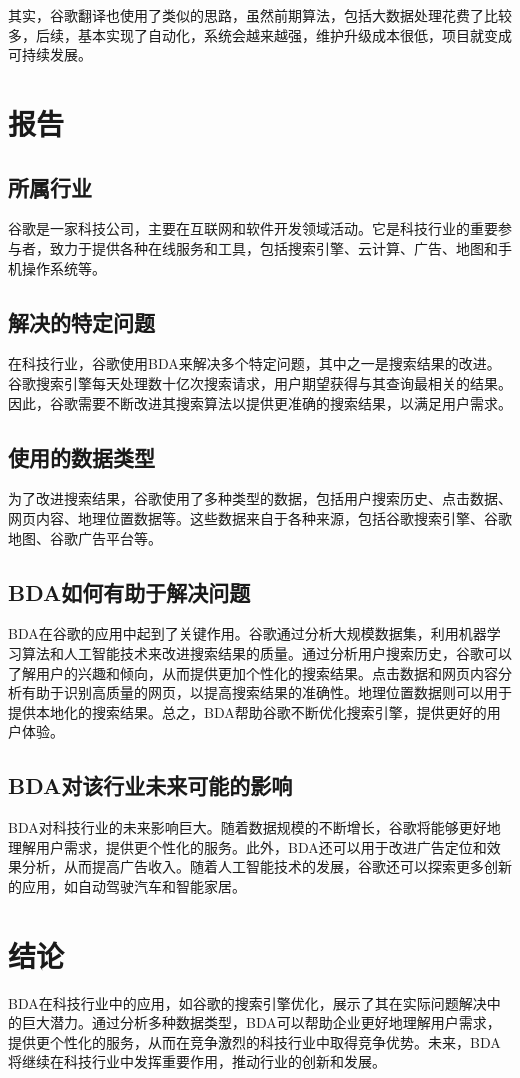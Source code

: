 \documentclass{article}
\begin{document}
其实，谷歌翻译也使用了类似的思路，虽然前期算法，包括大数据处理花费了比较多，后续，基本实现了自动化，系统会越来越强，维护升级成本很低，项目就变成可持续发展。
\section{报告}
\subsection{所属行业}
谷歌是一家科技公司，主要在互联网和软件开发领域活动。它是科技行业的重要参与者，致力于提供各种在线服务和工具，包括搜索引擎、云计算、广告、地图和手机操作系统等。

\subsection{解决的特定问题}
在科技行业，谷歌使用BDA来解决多个特定问题，其中之一是搜索结果的改进。谷歌搜索引擎每天处理数十亿次搜索请求，用户期望获得与其查询最相关的结果。因此，谷歌需要不断改进其搜索算法以提供更准确的搜索结果，以满足用户需求。

\subsection{使用的数据类型}
为了改进搜索结果，谷歌使用了多种类型的数据，包括用户搜索历史、点击数据、网页内容、地理位置数据等。这些数据来自于各种来源，包括谷歌搜索引擎、谷歌地图、谷歌广告平台等。

\subsection{BDA如何有助于解决问题}
BDA在谷歌的应用中起到了关键作用。谷歌通过分析大规模数据集，利用机器学习算法和人工智能技术来改进搜索结果的质量。通过分析用户搜索历史，谷歌可以了解用户的兴趣和倾向，从而提供更加个性化的搜索结果。点击数据和网页内容分析有助于识别高质量的网页，以提高搜索结果的准确性。地理位置数据则可以用于提供本地化的搜索结果。总之，BDA帮助谷歌不断优化搜索引擎，提供更好的用户体验。

\subsection{BDA对该行业未来可能的影响}
BDA对科技行业的未来影响巨大。随着数据规模的不断增长，谷歌将能够更好地理解用户需求，提供更个性化的服务。此外，BDA还可以用于改进广告定位和效果分析，从而提高广告收入。随着人工智能技术的发展，谷歌还可以探索更多创新的应用，如自动驾驶汽车和智能家居。

\section{结论}
BDA在科技行业中的应用，如谷歌的搜索引擎优化，展示了其在实际问题解决中的巨大潜力。通过分析多种数据类型，BDA可以帮助企业更好地理解用户需求，提供更个性化的服务，从而在竞争激烈的科技行业中取得竞争优势。未来，BDA将继续在科技行业中发挥重要作用，推动行业的创新和发展。
\end{document}
